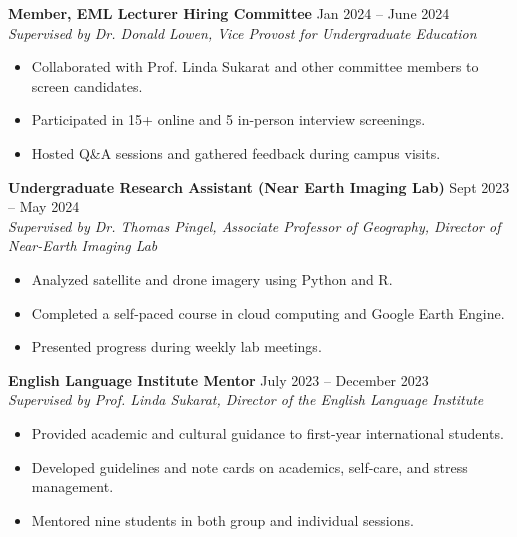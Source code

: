 \documentclass[11pt]{article}
\begin{document}
\noindent
\textbf{Member, EML Lecturer Hiring Committee} \hfill Jan 2024 -- June 2024 \\
\textit{Supervised by Dr. Donald Lowen, Vice Provost for Undergraduate Education }
\begin{itemize}[leftmargin=*]
    \item Collaborated with Prof. Linda Sukarat and other committee members to screen candidates.
    \item Participated in 15+ online and 5 in-person interview screenings.
    \item Hosted Q\&A sessions and gathered feedback during campus visits.
\end{itemize}


\noindent
\textbf{Undergraduate Research Assistant (Near Earth Imaging Lab)} \hfill Sept 2023 -- May 2024 \\
\textit{Supervised by Dr. Thomas Pingel, Associate Professor of Geography, Director of Near-Earth Imaging Lab}
\begin{itemize}[leftmargin=*]
    \item Analyzed satellite and drone imagery using Python and R.
    \item Completed a self-paced course in cloud computing and Google Earth Engine.
    \item Presented progress during weekly lab meetings.
\end{itemize}

\noindent
\textbf{English Language Institute Mentor} \hfill July 2023 -- December 2023\\
\textit{Supervised by Prof. Linda Sukarat, Director of the English Language Institute}
\begin{itemize}[leftmargin=*]
    \item Provided academic and cultural guidance to first-year international students.
    \item Developed guidelines and note cards on academics, self-care, and stress management.
    \item Mentored nine students in both group and individual sessions.
\end{itemize}
\end{document}

